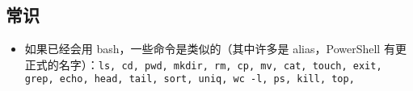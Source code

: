 
\subsection{常识}
\begin{itemize}
\item 如果已经会用 bash，一些命令是类似的（其中许多是 alias，PowerShell 有更正式的名字）：\verb`ls, cd, pwd, mkdir, rm, cp, mv, cat, touch, exit, grep, echo, head, tail, sort, uniq, wc -l, ps, kill, top, `
\end{itemize}

